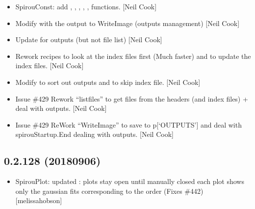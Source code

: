 \documentclass[a4paper,10pt,english]{report}
\begin{document}
\begin{itemize}
\item {} 
SpirouConst: add , ,
, , ,
 functions. {[}Neil Cook{]}

\item {} 
Modify  with the output to WriteImage (outputs management)
{[}Neil Cook{]}

\item {} 
Update  for outputs (but not file list) {[}Neil Cook{]}

\item {} 
Re\sphinxhyphen{}work  recipes to look at the index files first (Much
faster) \sphinxhyphen{} and to update the index files. {[}Neil Cook{]}

\item {} 
Modify  to sort out outputs and to skip index
file. {[}Neil Cook{]}

\item {} 
Issue \#429 \sphinxhyphen{} Re\sphinxhyphen{}work “listfiles” to get files from the headers (and
index files) + deal with outputs. {[}Neil Cook{]}

\item {} 
Issue \#429 \sphinxhyphen{} ReWork “WriteImage” to save to p{[}‘OUTPUTS’{]} and deal with
spirouStartup.End dealing with outputs. {[}Neil Cook{]}

\end{itemize}


\subsection{0.2.128 (2018\sphinxhyphen{}09\sphinxhyphen{}06)}
\label{\detokenize{misc/changelog:id353}}\begin{itemize}
\item {} 
SpirouPlot: updated : \sphinxhyphen{} plots stay open
until manually closed \sphinxhyphen{} each plot shows only the gaussian fits
corresponding to the order (Fixes \#442) {[}melissa\sphinxhyphen{}hobson{]}

\end{itemize}
\end{document}
